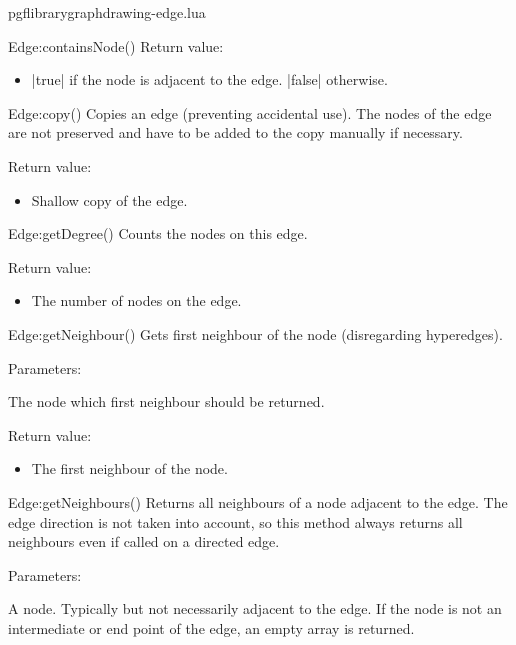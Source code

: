 \begin{filedescription}{pgflibrarygraphdrawing-edge.lua}
\begin{luacommand}{{Edge:containsNode}()}
Return value:
\begin{itemize} \item[] |true| if the node is adjacent to the edge. |false| otherwise.  \end{itemize}


\end{luacommand}\begin{luacommand}{{Edge:copy}()}
Copies an edge (preventing accidental use).  The nodes of the edge are not preserved and have to be added to the copy manually if necessary. 


Return value:
\begin{itemize} \item[] Shallow copy of the edge.  \end{itemize}


\end{luacommand}\begin{luacommand}{{Edge:getDegree}()}
Counts the nodes on this edge. 


Return value:
\begin{itemize} \item[] The number of nodes on the edge.  \end{itemize}


\end{luacommand}\begin{luacommand}{{Edge:getNeighbour}()}
Gets first neighbour of the node (disregarding hyperedges). 

Parameters:
\begin{parameterdescription}
	\item[\meta{node}] The node which first neighbour should be returned. 
\end{parameterdescription}


Return value:
\begin{itemize} \item[] The first neighbour of the node.  \end{itemize}


\end{luacommand}\begin{luacommand}{{Edge:getNeighbours}()}
Returns all neighbours of a node adjacent to the edge.  The edge direction is not taken into account, so this method always returns all neighbours even if called on a directed edge. 

Parameters:
\begin{parameterdescription}
	\item[\meta{node}] A node. Typically but not necessarily adjacent to the edge. If the node is not an intermediate or end point of the edge, an empty array is returned. 
\end{parameterdescription}



\end{luacommand}
\end{filedescription}
